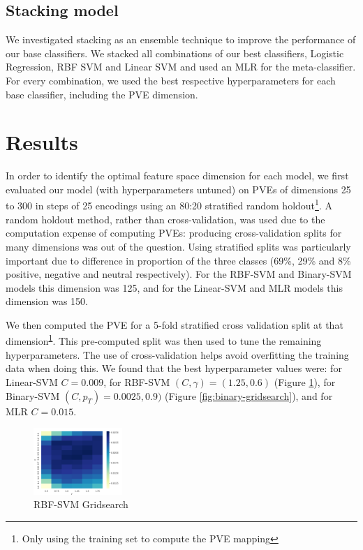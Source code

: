 \documentclass[11pt]{article}
\begin{document}
\subsection{Stacking model}
We investigated stacking as an ensemble technique to improve the performance of our base classifiers. We stacked all combinations of our best classifiers, Logistic Regression, RBF SVM and Linear SVM and used an MLR for the meta-classifier. For every combination, we used the best respective hyperparameters for each base classifier, including the PVE dimension.

\section{Results}
In order to identify the optimal feature space dimension for each model, we first evaluated our model (with hyperparameters untuned) on PVEs of dimensions 25 to 300 in steps of 25 encodings using an 80:20 stratified random holdout\footnote{\label{fn:training-d2v}Only using the training set to compute the PVE mapping}. A random holdout method, rather than cross-validation, was used due to the computation expense of computing PVEs: producing cross-validation splits for many dimensions was out of the question. Using stratified splits was particularly important due to difference in proportion of the three classes (69\%, 29\% and 8\% positive, negative and neutral respectively). For the RBF-SVM and Binary-SVM models this dimension was 125, and for the Linear-SVM and MLR models this dimension was 150.

We then computed the PVE for a 5-fold stratified cross validation split at that dimension\textsuperscript{\ref{fn:training-d2v}}. This pre-computed split was then used to tune the remaining hyperparameters. The use of cross-validation helps avoid overfitting the training data when doing this. We found that the best hyperparameter values were: for Linear-SVM $C = 0.009$, for RBF-SVM $(C, \gamma) = (1.25, 0.6)$ (Figure \ref{fig:rbf-gridsearch}), for Binary-SVM $(C, p_T) = 0.0025, 0.9)$ (Figure \ref{fig:binary-gridsearch}), and for MLR $C = 0.015$.
\begin{figure}
	\centering
	\includegraphics[width = 0.3\textwidth]{fig-rbf-gridsearch.png}
	\caption{RBF-SVM Gridsearch}
	\label{fig:rbf-gridsearch}
\end{figure}
\end{document}

